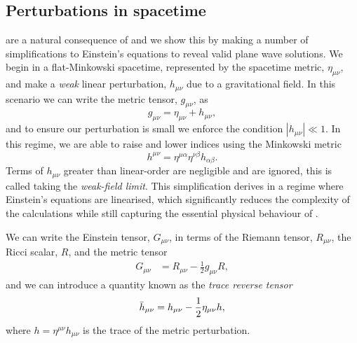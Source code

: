 \subsection{\label{1:sec:perturbations}Perturbations in spacetime}

\Gws are a natural consequence of \GR and we show this by making a number of simplifications to Einstein's equations to reveal valid plane wave solutions. We begin in a flat-Minkowski spacetime, represented by the spacetime metric, $\eta_{\mu\nu}$, and make a \textit{weak} linear perturbation, $h_{\mu\nu}$ due to a gravitational field. In this scenario we can write the metric tensor, $g_{\mu\nu}$, as
%
\begin{equation}
    g_{\mu\nu} = \eta_{\mu\nu} + h_{\mu\nu},
    \label{1:eq:metric_perturbation}
\end{equation}
%
and to ensure our perturbation is small we enforce the condition $|h_{\mu\nu}| \ll 1$. In this regime, we are able to raise and lower indices using the Minkowski metric
%
\begin{equation}
    h^{\mu\nu} = \eta^{\mu\alpha}\eta^{\nu\beta}h_{\alpha\beta}.
    \label{1:eq:raise_lowering_indices}
\end{equation}
%
Terms of $h_{\mu\nu}$ greater than linear-order are negligible and are ignored, this is called taking the \textit{weak-field limit}. This simplification derives \gws in a regime where Einstein's equations are linearised, which significantly reduces the complexity of the calculations while still capturing the essential physical behaviour of \gws.

We can write the Einstein tensor, $G_{\mu\nu}$, in terms of the Riemann tensor, $R_{\mu\nu}$, the Ricci scalar, $R$, and the metric tensor
%
\begin{align}
    G_{\mu\nu} &= R_{\mu\nu} - \frac{1}{2}g_{\mu\nu}R,
    \label{1:eq:g_munu_riemann}
\end{align}
%
and we can introduce a quantity known as the \textit{trace reverse tensor}
%
\begin{equation}
    \Bar{h}_{\mu\nu} = h_{\mu\nu} - \frac{1}{2} \eta_{\mu\nu}h,
\end{equation}
%
where $h = \eta^{\mu\nu}h_{\mu\nu}$ is the trace of the metric perturbation.

